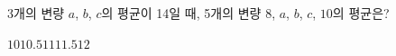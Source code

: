 3개의 변량 $a$, $b$, $c$의 평균이 14일 때, 5개의 변량 $8$, $a$, $b$, $c$, $10$의 평균은?
\begin{choices32}{$10$}{$10.5$}{$11$}{$11.5$}{$12$}\end{choices32}
